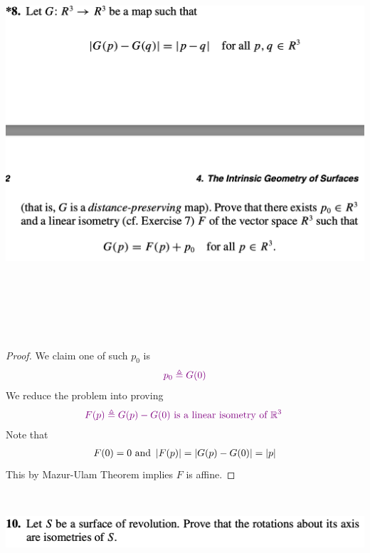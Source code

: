 \documentclass{report}
\begin{document}
\begin{question}{}{}
\includegraphics[height=15cm,width=18cm]{hw64}
\end{question}
\begin{proof}
We claim one of such $p_0$ is 
 \begin{align*}
\textcolor{violet}{p_0\triangleq G(0)}
\end{align*}
We reduce the problem into proving 
\begin{align*}
  \textcolor{violet}{F(p)\triangleq G(p)-G(0)\text{ is a linear isometry of $\mathbb{R}^3$ }}
\end{align*}
Note that 
\begin{align*}
F(0)=0\text{ and } \left|F(p)\right|=\left|G(p)-G(0)\right|= \left|p\right|
\end{align*}
This by Mazur-Ulam Theorem implies $F$ is affine. 
\end{proof}
\begin{question}{}{}
\includegraphics[height=3cm,width=18cm]{hw65}
\end{question}
\end{document}
